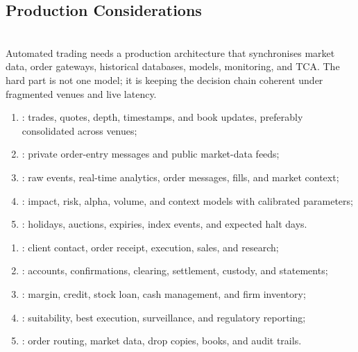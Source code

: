 \subsection{Production Considerations}

\begin{principle} \\
Automated trading needs a production architecture that synchronises market data, order gateways, historical databases, models, monitoring, and TCA. The hard part is not one model; it is keeping the decision chain coherent under fragmented venues and live latency.
\end{principle}

\begin{taxonomy} 
\begin{enumerate}[label=\roman*.]
\setlength{\itemsep}{0pt}
\item {}: trades, quotes, depth, timestamps, and book updates, preferably consolidated across venues;
\item {}: private order-entry messages and public market-data feeds;
\item {}: raw events, real-time analytics, order messages, fills, and market context;
\item {}: impact, risk, alpha, volume, and context models with calibrated parameters;
\item {}: holidays, auctions, expiries, index events, and expected halt days.
\end{enumerate}
\end{taxonomy}

\begin{taxonomy} 
\begin{enumerate}[label=\roman*.]
\setlength{\itemsep}{0pt}
\item {}: client contact, order receipt, execution, sales, and research;
\item {}: accounts, confirmations, clearing, settlement, custody, and statements;
\item {}: margin, credit, stock loan, cash management, and firm inventory;
\item {}: suitability, best execution, surveillance, and regulatory reporting;
\item {}: order routing, market data, drop copies, books, and audit trails.
\end{enumerate}
\end{taxonomy}

